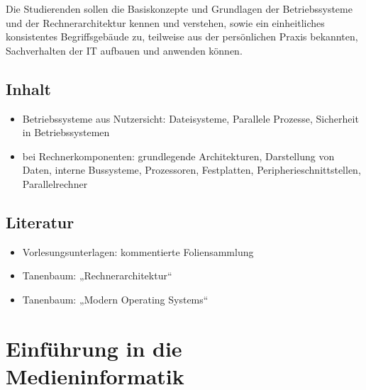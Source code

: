 Die Studierenden sollen die Basiskonzepte und Grundlagen der
Betriebssysteme und der Rechnerarchitektur kennen und verstehen, sowie
ein einheitliches konsistentes Begriffsgebäude zu, teilweise aus der
persönlichen Praxis bekannten, Sachverhalten der IT aufbauen und
anwenden können.

\hypertarget{inhaltpathlabelmi-2017modulbeschreibungen-bachelorba_einfhrunginbetriebssystemeundrechnerarchitektur}{%
\section*{Inhalt\label{/mi-2017/modulbeschreibungen-bachelor/BA_EinfhrunginBetriebssystemeundRechnerarchitektur}}\label{inhaltpathlabelmi-2017modulbeschreibungen-bachelorba_einfhrunginbetriebssystemeundrechnerarchitektur}}

\begin{itemize}
\tightlist
\item
  Betriebssysteme aus Nutzersicht: Dateisysteme, Parallele Prozesse,
  Sicherheit in Betriebssystemen
\item
  bei Rechnerkomponenten: grundlegende Architekturen, Darstellung von
  Daten, interne Bussysteme, Prozessoren, Festplatten,
  Peripherieschnittstellen, Parallelrechner
\end{itemize}

\hypertarget{literaturpathlabelmi-2017modulbeschreibungen-bachelorba_einfhrunginbetriebssystemeundrechnerarchitektur}{%
\section*{Literatur\label{/mi-2017/modulbeschreibungen-bachelor/BA_EinfhrunginBetriebssystemeundRechnerarchitektur}}\label{literaturpathlabelmi-2017modulbeschreibungen-bachelorba_einfhrunginbetriebssystemeundrechnerarchitektur}}

\begin{itemize}
\tightlist
\item
  Vorlesungsunterlagen: kommentierte Foliensammlung
\item
  Tanenbaum: „Rechnerarchitektur``
\item
  Tanenbaum: „Modern Operating Systems``
\end{itemize}

\hypertarget{einfuxfchrung-in-die-medieninformatikpathlabelmi-2017modulbeschreibungen-bachelorba_einfhrungindiemedieninformatik}{%
\chapter{Einführung in die
Medieninformatik\label{/mi-2017/modulbeschreibungen-bachelor/BA_EinfhrungindieMedieninformatik}}\label{einfuxfchrung-in-die-medieninformatikpathlabelmi-2017modulbeschreibungen-bachelorba_einfhrungindiemedieninformatik}}

